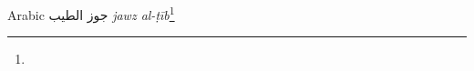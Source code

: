 \begin{etymology}\label{ety:jawz_al_tib}
Arabic {جوز الطيب} \textit{jawz al-ṭīb}\footnote{}
\end{etymology}